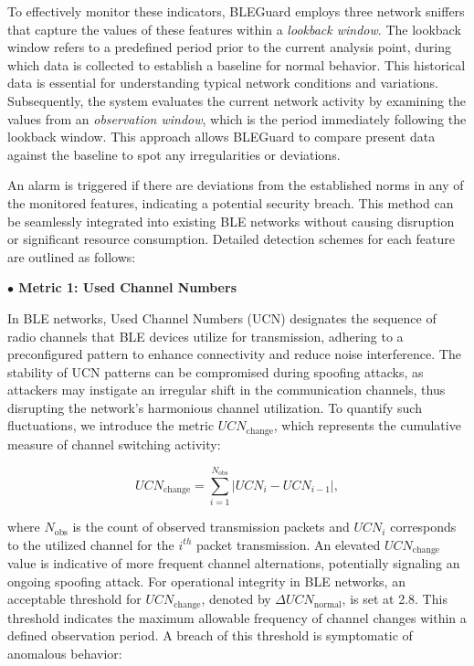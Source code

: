 \vspace{8pt}

To effectively monitor these indicators, BLEGuard employs three network sniffers that capture the values of these features within a \textit{lookback window}. The lookback window refers to a predefined period prior to the current analysis point, during which data is collected to establish a baseline for normal behavior. This historical data is essential for understanding typical network conditions and variations. Subsequently, the system evaluates the current network activity by examining the values from an \textit{observation window}, which is the period immediately following the lookback window. This approach allows BLEGuard to compare present data against the baseline to spot any irregularities or deviations.

\vspace{8pt}


An alarm is triggered if there are deviations from the established norms in any of the monitored features, indicating a potential security breach. This method can be seamlessly integrated into existing BLE networks without causing disruption or significant resource consumption. Detailed detection schemes for each feature are outlined as follows:

\vspace{8pt}

\noindent \textbf{$\bullet$ Metric 1: Used Channel Numbers}

\noindent In BLE networks, Used Channel Numbers (UCN) designates the sequence of radio channels that BLE devices utilize for transmission, adhering to a preconfigured pattern to enhance connectivity and reduce noise interference. The stability of UCN patterns can be compromised during spoofing attacks, as attackers may instigate an irregular shift in the communication channels, thus disrupting the network's harmonious channel utilization. To quantify such fluctuations, we introduce the metric \( UCN_{\text{change}} \), which represents the cumulative measure of channel switching activity:

\vspace{-4pt}

\begin{equation}
UCN_{\text{change}} = \sum_{i=1}^{N_{\text{obs}}} \left| UCN_i - UCN_{i-1} \right|,
\end{equation}

where \( N_{\text{obs}} \) is the count of observed transmission packets and \( UCN_i \) corresponds to the utilized channel for the \( i^{th} \) packet transmission. An elevated \( UCN_{\text{change}} \) value is indicative of more frequent channel alternations, potentially signaling an ongoing spoofing attack. For operational integrity in BLE networks, an acceptable threshold for \( UCN_{\text{change}} \), denoted by \( \Delta UCN_{\text{normal}} \), is set at 2.8. This threshold indicates the maximum allowable frequency of channel changes within a defined observation period. A breach of this threshold is symptomatic of anomalous behavior:

